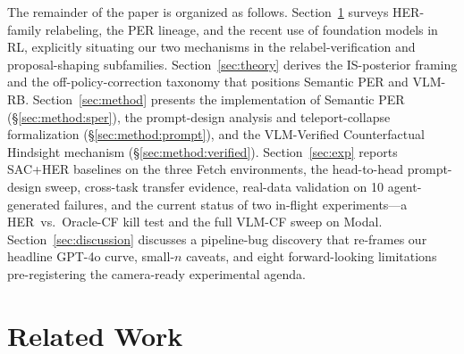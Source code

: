 \documentclass{article}
\begin{document}
The remainder of the paper is organized as follows.
Section~\ref{sec:related} surveys HER-family relabeling, the PER lineage, and
the recent use of foundation models in RL, explicitly situating our two
mechanisms in the relabel-verification and proposal-shaping subfamilies.
Section~\ref{sec:theory} derives the IS-posterior framing and the
off-policy-correction taxonomy that positions Semantic PER and VLM-RB.
Section~\ref{sec:method} presents the implementation of Semantic PER
(\S\ref{sec:method:sper}), the prompt-design analysis and teleport-collapse
formalization (\S\ref{sec:method:prompt}), and the VLM-Verified Counterfactual
Hindsight mechanism (\S\ref{sec:method:verified}).
Section~\ref{sec:exp} reports SAC+HER baselines on the three Fetch environments,
the head-to-head prompt-design sweep, cross-task transfer evidence, real-data
validation on 10 agent-generated failures, and the current status of two
in-flight experiments---a HER~vs.~Oracle-CF kill test and the full
VLM-CF sweep on Modal.
Section~\ref{sec:discussion} discusses a pipeline-bug discovery that re-frames
our headline GPT-4o curve, small-$n$ caveats, and eight forward-looking
limitations pre-registering the camera-ready experimental agenda.

\section{Related Work}
\label{sec:related}
\end{document}
